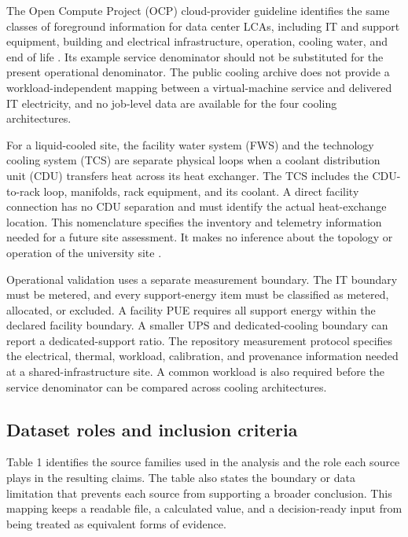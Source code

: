 \documentclass[review,a4paper,fleqn]{cas-sc}
\begin{document}
The Open Compute Project (OCP) cloud-provider guideline identifies the same classes of foreground information for data center LCAs, including IT and support equipment, building and electrical infrastructure, operation, cooling water, and end of life \cite{ref50,ref51,ref52}. Its example service denominator should not be substituted for the present operational denominator. The public cooling archive does not provide a workload-independent mapping between a virtual-machine service and delivered IT electricity, and no job-level data are available for the four cooling architectures.

For a liquid-cooled site, the facility water system (FWS) and the technology cooling system (TCS) are separate physical loops when a coolant distribution unit (CDU) transfers heat across its heat exchanger. The TCS includes the CDU-to-rack loop, manifolds, rack equipment, and its coolant. A direct facility connection has no CDU separation and must identify the actual heat-exchange location. This nomenclature specifies the inventory and telemetry information needed for a future site assessment. It makes no inference about the topology or operation of the university site \cite{ref53,ref54,ref55,ref56}.

Operational validation uses a separate measurement boundary. The IT boundary must be metered, and every support-energy item must be classified as metered, allocated, or excluded. A facility PUE requires all support energy within the declared facility boundary. A smaller UPS and dedicated-cooling boundary can report a dedicated-support ratio. The repository measurement protocol specifies the electrical, thermal, workload, calibration, and provenance information needed at a shared-infrastructure site. A common workload is also required before the service denominator can be compared across cooling architectures.

\subsection{Dataset roles and inclusion criteria}
Table 1 identifies the source families used in the analysis and the role each source plays in the resulting claims. The table also states the boundary or data limitation that prevents each source from supporting a broader conclusion. This mapping keeps a readable file, a calculated value, and a decision-ready input from being treated as equivalent forms of evidence.
\end{document}
